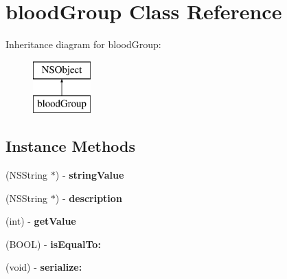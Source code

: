 \hypertarget{interfaceblood_group}{}\section{blood\+Group Class Reference}
\label{interfaceblood_group}
Inheritance diagram for blood\+Group\+:\begin{figure}[H]
\begin{center}
\leavevmode
\includegraphics[height=2.000000cm]{interfaceblood_group}
\end{center}
\end{figure}
\subsection*{Instance Methods}
\begin{DoxyCompactItemize}
\item 
\hypertarget{interfaceblood_group_a9ce481be4a14cbd12e6f4a31fe133730}{}(N\+S\+String $\ast$) -\/ {\bfseries string\+Value}\label{interfaceblood_group_a9ce481be4a14cbd12e6f4a31fe133730}

\item 
\hypertarget{interfaceblood_group_ab36ee97b363a6278a6e155019848dfd8}{}(N\+S\+String $\ast$) -\/ {\bfseries description}\label{interfaceblood_group_ab36ee97b363a6278a6e155019848dfd8}

\item 
\hypertarget{interfaceblood_group_abd29dc8ab9c54f611bb379e4c97555a5}{}(int) -\/ {\bfseries get\+Value}\label{interfaceblood_group_abd29dc8ab9c54f611bb379e4c97555a5}

\item 
\hypertarget{interfaceblood_group_a90f879b66b0bac5b7217028460d0a4c9}{}(B\+O\+O\+L) -\/ {\bfseries is\+Equal\+To\+:}\label{interfaceblood_group_a90f879b66b0bac5b7217028460d0a4c9}

\item 
\hypertarget{interfaceblood_group_af98c47113f0aeabce1ebe769280747e6}{}(void) -\/ {\bfseries serialize\+:}\label{interfaceblood_group_af98c47113f0aeabce1ebe769280747e6}

\end{DoxyCompactItemize}
